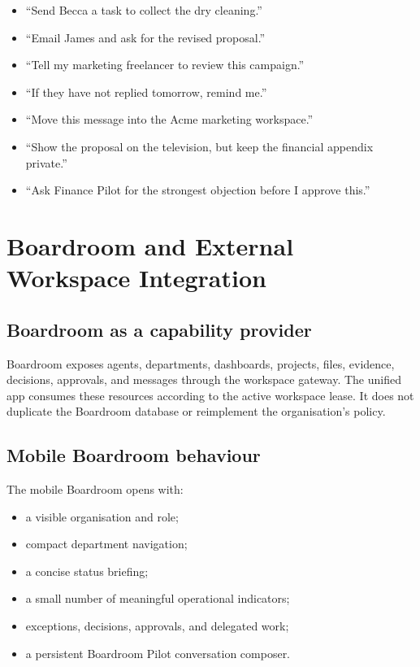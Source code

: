 \documentclass[11pt,a4paper]{article}
\begin{document}
\begin{itemize}[leftmargin=*]
  \item ``Send Becca a task to collect the dry cleaning.''
  \item ``Email James and ask for the revised proposal.''
  \item ``Tell my marketing freelancer to review this campaign.''
  \item ``If they have not replied tomorrow, remind me.''
  \item ``Move this message into the Acme marketing workspace.''
  \item ``Show the proposal on the television, but keep the financial appendix private.''
  \item ``Ask Finance Pilot for the strongest objection before I approve this.''
\end{itemize}

\section{Boardroom and External Workspace Integration}

\subsection{Boardroom as a capability provider}

Boardroom exposes agents, departments, dashboards, projects, files, evidence,
decisions, approvals, and messages through the workspace gateway.  The unified
app consumes these resources according to the active workspace lease.  It does
not duplicate the Boardroom database or reimplement the organisation's policy.

\subsection{Mobile Boardroom behaviour}

The mobile Boardroom opens with:

\begin{itemize}[leftmargin=*]
  \item a visible organisation and role;
  \item compact department navigation;
  \item a concise status briefing;
  \item a small number of meaningful operational indicators;
  \item exceptions, decisions, approvals, and delegated work;
  \item a persistent Boardroom Pilot conversation composer.
\end{itemize}
\end{document}
